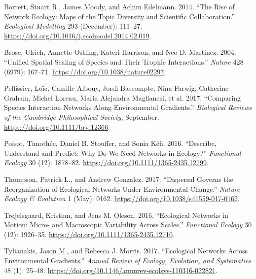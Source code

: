 \leavevmode\hypertarget{ref-BorrMood14}{}%
Borrett, Stuart R., James Moody, and Achim Edelmann. 2014. ``The Rise of
Network Ecology: Maps of the Topic Diversity and Scientific
Collaboration.'' \emph{Ecological Modelling} 293 (December): 111--27.
\url{https://doi.org/10.1016/j.ecolmodel.2014.02.019}.

\leavevmode\hypertarget{ref-BrosOstl04}{}%
Brose, Ulrich, Annette Ostling, Kateri Harrison, and Neo D. Martinez.
2004. ``Unified Spatial Scaling of Species and Their Trophic
Interactions.'' \emph{Nature} 428 (6979): 167--71.
\url{https://doi.org/10.1038/nature02297}.

\leavevmode\hypertarget{ref-PellAlbo17}{}%
Pellissier, Loïc, Camille Albouy, Jordi Bascompte, Nina Farwig,
Catherine Graham, Michel Loreau, Maria Alejandra Maglianesi, et al.
2017. ``Comparing Species Interaction Networks Along Environmental
Gradients.'' \emph{Biological Reviews of the Cambridge Philosophical
Society}, September. \url{https://doi.org/10.1111/brv.12366}.

\leavevmode\hypertarget{ref-PoisStou16}{}%
Poisot, Timothée, Daniel B. Stouffer, and Sonia Kéfi. 2016. ``Describe,
Understand and Predict: Why Do We Need Networks in Ecology?''
\emph{Functional Ecology} 30 (12): 1878--82.
\url{https://doi.org/10.1111/1365-2435.12799}.

\leavevmode\hypertarget{ref-ThomGonz17}{}%
Thompson, Patrick L., and Andrew Gonzalez. 2017. ``Dispersal Governs the
Reorganization of Ecological Networks Under Environmental Change.''
\emph{Nature Ecology \& Evolution} 1 (May): 0162.
\url{https://doi.org/10.1038/s41559-017-0162}.

\leavevmode\hypertarget{ref-TrojOles16}{}%
Trøjelsgaard, Kristian, and Jens M. Olesen. 2016. ``Ecological Networks
in Motion: Micro- and Macroscopic Variability Across Scales.''
\emph{Functional Ecology} 30 (12): 1926--35.
\url{https://doi.org/10.1111/1365-2435.12710}.

\leavevmode\hypertarget{ref-TyliMorr17}{}%
Tylianakis, Jason M., and Rebecca J. Morris. 2017. ``Ecological Networks
Across Environmental Gradients.'' \emph{Annual Review of Ecology,
Evolution, and Systematics} 48 (1): 25--48.
\url{https://doi.org/10.1146/annurev-ecolsys-110316-022821}.
